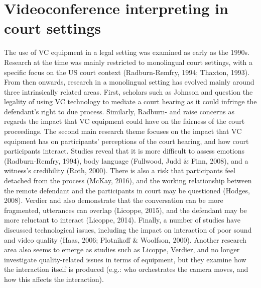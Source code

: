 \documentclass[output=paper]{langsci/langscibook}
\begin{document}
\section{Videoconference interpreting in court settings}
The use of VC equipment in a legal setting was examined as early as the 1990s. Research at the time was mainly restricted to monolingual court settings, with a specific focus on the US court context (Radburn-Remfry, 1994; Thaxton, 1993). From then onwards, research in a monolingual setting has evolved mainly around three intrinsically related areas. First, scholars such as Johnson and \citet{Wiggins2006} question the legality of using VC technology to mediate a court hearing as it could infringe the defendant’s right to due process. Similarly, Radburn-\citet{Remfry1994} and \citet{Thaxton1993} raise concerns as regards the impact that VC equipment could have on the fairness of the court proceedings. The second main research theme focuses on the impact that VC equipment has on participants’ perceptions of the court hearing, and how court participants interact. Studies reveal that it is more difficult to assess emotions (Radburn-Remfry, 1994), body language (Fullwood, Judd \& Finn, 2008), and a witness’s credibility (Roth, 2000). There is also a risk that participants feel detached from the process (McKay, 2016), and the working relationship between the remote defendant and the participants in court may be questioned (Hodges, 2008). Verdier and \citet{Licoppe2011} also demonstrate that the conversation can be more fragmented, utterances can overlap (Licoppe, 2015), and the defendant may be more reluctant to interact (Licoppe, 2014). Finally, a number of studies have discussed technological issues, including the impact on interaction of poor sound and video quality (Haas, 2006; Plotnikoff \& Woolfson, 2000). Another research area also seems to emerge as studies such as Licoppe, Verdier, and \citet{Dumoulin2013} no longer investigate quality-related issues in terms of equipment, but they examine how the interaction itself is produced (e.g.: who orchestrates the camera moves, and how this affects the interaction). 
\end{document}
